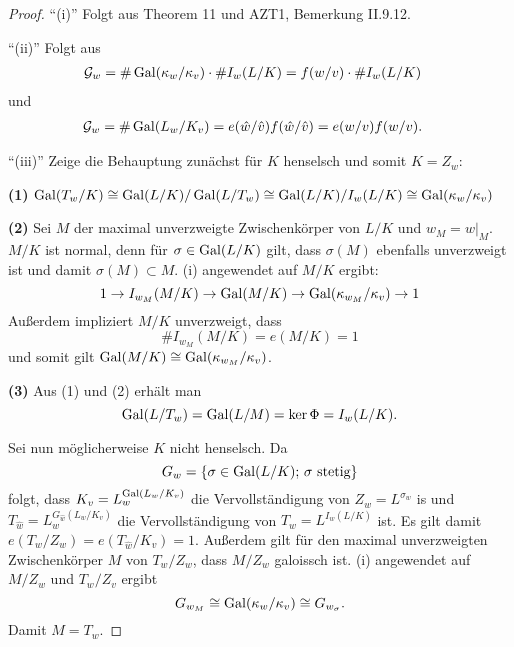 \begin{proof}
	\enquote{(i)} Folgt aus Theorem 11 und AZT1, Bemerkung II.9.12.
	
	\bigskip \enquote{(ii)} Folgt aus
	\begin{align*}
	\mathcal{G}_w
	&= \# \operatorname{Gal}(\kappa_w / \kappa_v) \cdot \# I_w(L/K)
	=f(w/v) \cdot \#I_w(L/K)
	\end{align*}
	und
	\begin{align*}
	\mathcal{G}_w
	&= \# \operatorname{Gal}(L_w / K_v) 
	= e(\hat{w}/\hat{v}) f(\hat{w}/\hat{v}) 
	= e(w/v) f(w/v). 
	\end{align*}
	
	\bigskip \enquote{(iii)} Zeige die Behauptung zunächst für $K$ henselsch und somit $K=Z_w$:
	
	\bigskip \textbf{(1)} $ \operatorname{Gal}(T_w/K) \cong \operatorname{Gal}(L/K) / \operatorname{Gal}(L/T_w)
	 \cong \operatorname{Gal}(L/K) / I_w(L/K) \cong \operatorname{Gal}(\kappa_w/\kappa_v)$
	
	\bigskip \textbf{(2)} Sei $M$ der maximal unverzweigte Zwischenkörper von $L/K$ und $w_M=w|_M$. $M/K$ ist normal, denn für $\sigma\in\operatorname{Gal}(L/K)$ gilt, dass $\sigma(M)$ ebenfalls unverzweigt ist und damit $\sigma(M)\subset M$. (i) angewendet auf $M/K$ ergibt:
	\[ 1 \to I_{w_M}(M/K) \to \operatorname{Gal}(M/K) \to \operatorname{Gal}(\kappa_{w_M} / \kappa_v) \to 1
	\]
	Außerdem impliziert $M/K$ unverzweigt, dass
	\[ \# I_{w_M}(M/K) = e(M/K) =1
	\]
	und somit gilt $\operatorname{Gal}(M/K) \cong \operatorname{Gal} (\kappa_{w_M} / \kappa_v)$.
	
	\bigskip \textbf{(3)} Aus (1) und (2) erhält man
	\[ \operatorname{Gal}(L/T_w)=\operatorname{Gal}(L/M)= \ker \Phi = I_w(L/K).
	\]
	
	\bigskip Sei nun möglicherweise $K$ nicht henselsch.
	Da
	\[ G_w = \{ \sigma \in \operatorname{Gal}(L/K); \, \sigma \text{ stetig} \}
	\]
	folgt, dass $ K_v = L_w^{\operatorname{Gal}(L_w/K_v)} $ die Vervollständigung von $Z_w = L^{\sigma_w}$ is und $T_{\hat{w}} = L_w^{G_{\hat{w}}(L_w/K_v)}$ die Vervollständigung von $T_w = L^{I_w(L/K)}$ ist.
	Es gilt damit $e(T_w/Z_w)=e(T_{\hat{w}}/K_v) =1$. Außerdem gilt für den maximal unverzweigten Zwischenkörper $M$ von $T_w/Z_w$, dass $M/Z_w$ galoissch ist.
	(i) angewendet auf $M/Z_w$ und $T_w/Z_v$ ergibt
	\[ G_{w_M} \cong \operatorname{Gal}(\kappa_w/\kappa_v) \cong G_{w_\sigma}.
	\]
	Damit $M= T_w$.
\end{proof}












